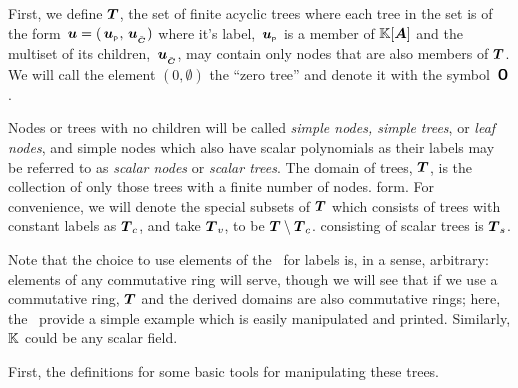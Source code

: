 First, we define $\boldsymbol{T}$, the set of finite acyclic trees where each
tree in the set is of the form $\,\boldsymbol{u} = ({\,\boldsymbol{u}}_{{}_{\mathsf{P}}}, {\,\boldsymbol{u}}_{{}_{\bar{\boldsymbol{C}}}})$
where it's label, ${\,\boldsymbol{u}}_{{}_{\mathsf{P}}}$ is a member of $\mathbb{K}[{\boldsymbol{A}}]$ and the
multiset of its children, ${\,\boldsymbol{u}}_{{}_{\bar{\boldsymbol{C}}}}$, may contain only nodes that are
also members of $\boldsymbol{T}$.  We will call the element $(0, \emptyset)$ the
``zero tree'' and denote it with the symbol $\,\boldsymbol{\mathsf{O}}$.



Nodes or trees with no children will be called \emph{simple nodes,
  simple trees}, or \emph{leaf nodes}, and simple nodes which also
have scalar polynomials as their labels may be referred to as
\emph{scalar nodes} or \emph{scalar trees}. The domain of trees,
$\boldsymbol{T}$, is the collection of only those trees with a finite number of
nodes.  form.  For convenience, we will denote the special subsets of
$\boldsymbol{T}$ which consists of trees with constant labels as $\boldsymbol{T}_c$, and
take $\boldsymbol{T}_v$, to be $\boldsymbol{T} \setminus \boldsymbol{T}_c$.  %
consisting of scalar trees is $\boldsymbol{T}_s$.

Note that the choice to use elements of the \polytypes\  for labels is, in a
sense, arbitrary: elements of any commutative ring will serve, though
we will see that if we use a commutative ring, $\boldsymbol{T}$ and the derived
domains are also commutative rings; here, the \polytypes\ provide a
simple example which is easily manipulated and printed. Similarly,
$\mathbb{K}$ could be any scalar field.

First, the definitions for some basic tools for manipulating these trees.

